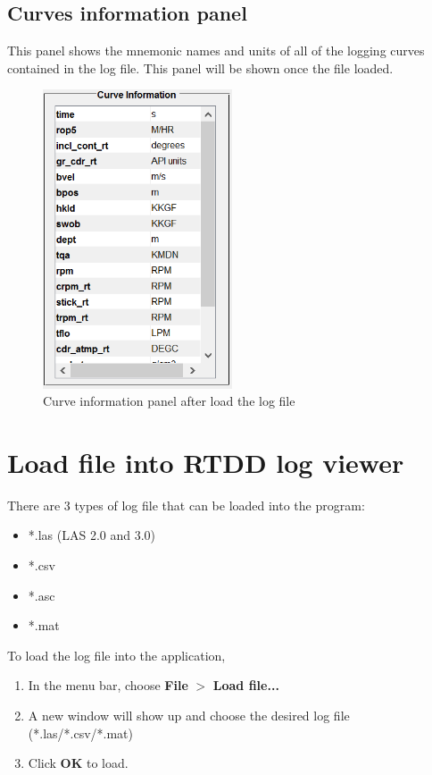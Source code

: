 \documentclass[12pt,a4paper,oneside]{report}
\begin{document}
\subsection{Curves information panel}
This panel shows the mnemonic names and units of all of the logging curves contained in the log file. This panel will be shown once the file loaded.
\begin{figure}[h!]
\centering
\includegraphics[width=0.5\textwidth]{fig/available_curve_panel.PNG}
\caption{Curve information panel after load the log file}
\label{fig:curve_info_panel}
\end{figure}

\section{Load file into RTDD log viewer}
There are 3 types of log file that can be loaded into the program:
\begin{itemize}
\setlength\itemsep{0.1em}
\item *.las (LAS 2.0 and 3.0)
\item *.csv
\item *.asc
\item *.mat
\end{itemize}

\noindent To load the log file into the application,
\begin{enumerate}
\setlength\itemsep{0.1em}
\item In the menu bar, choose \textbf{File} $>$ \textbf{Load file...}
\item A new window will show up and choose the desired log file (*.las/*.csv/*.mat)
\item Click \textbf{OK} to load.
\end{enumerate}
\end{document}
